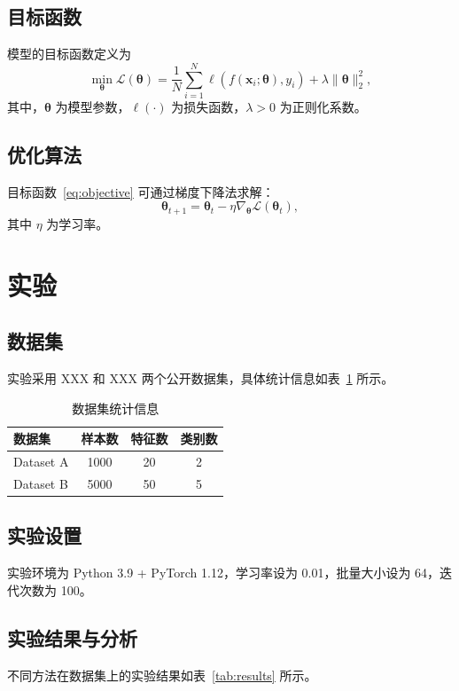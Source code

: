 \documentclass[12pt, a4paper]{ctexart}
\begin{document}
\subsection{目标函数}
模型的目标函数定义为
\begin{equation}
\label{eq:objective}
\min_{\bm{\theta}} \mathcal{L}(\bm{\theta}) = \frac{1}{N} \sum_{i=1}^{N} \ell(f(\bm{x}_i; \bm{\theta}), y_i) + \lambda \|\bm{\theta}\|_2^2,
\end{equation}
其中，$\bm{\theta}$ 为模型参数，$\ell(\cdot)$ 为损失函数，$\lambda > 0$ 为正则化系数。

\subsection{优化算法}
目标函数~\eqref{eq:objective} 可通过梯度下降法求解：
\begin{equation}
\bm{\theta}_{t+1} = \bm{\theta}_t - \eta \nabla_{\bm{\theta}} \mathcal{L}(\bm{\theta}_t),
\end{equation}
其中 $\eta$ 为学习率。

\section{实验}
\label{sec:experiments}

\subsection{数据集}
实验采用 XXX 和 XXX 两个公开数据集，具体统计信息如表~\ref{tab:datasets} 所示。

\begin{table}[htbp]
\centering
\caption{数据集统计信息}
\label{tab:datasets}
\begin{tabular}{lccc}
\toprule
数据集 & 样本数 & 特征数 & 类别数 \\
\midrule
Dataset A & 1000 & 20 & 2 \\
Dataset B & 5000 & 50 & 5 \\
\bottomrule
\end{tabular}
\end{table}

\subsection{实验设置}
实验环境为 Python 3.9 + PyTorch 1.12，学习率设为 0.01，批量大小设为 64，迭代次数为 100。

\subsection{实验结果与分析}
不同方法在数据集上的实验结果如表~\ref{tab:results} 所示。
\end{document}
